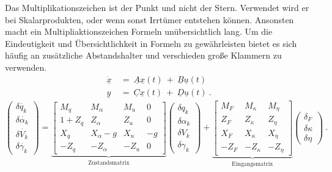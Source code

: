Das Multiplikationszeichen ist der Punkt und nicht der Stern. Verwendet wird er bei Skalarprodukten, oder wenn sonst Irrtümer entstehen können. Ansonsten macht ein Multipliaktionszeichen Formeln unübersichtlich lang. Um die Eindeutigkeit und Übersichtlichkeit in Formeln zu gewährleisten bietet es sich häufig an zusätzliche Abstandshalter und verschieden große Klammern zu verwenden.
\begin{equation}
\begin{split}
\dot{\underline{x}}&~=~\underline{A}\underline{x}(t)~+~%
							  \underline{B}\underline{u}(t)\\
\underline{y}&~=~\underline{C}\underline{x}(t)~+~\underline{D}\underline{u}(t)\:.
\end{split}
\label{eq:Gleichung1}
\end{equation} 
\begin{equation}
\begin{pmatrix}
	\delta\dot{q_k}		\\
	\delta\dot{\alpha_k}	\\
	\delta\dot{V_k}		\\
	\delta\dot{\gamma_k} \end{pmatrix}%
=\underbrace{\begin{bmatrix}
	M_q			& M_{\alpha} 	& M_u 	& 0	\\
	1+Z_q 		& Z_{\alpha} 	& Z_u	& 0	\\
	X_q			& X_{\alpha}-g	& X_u 	& -g\\
	-Z_q 		& -Z_{\alpha} 	& -Z_u	& 0	\end{bmatrix}}_{\text{Zustandsmatrix}}%
\begin{pmatrix}
	\delta{q_k}			\\
	\delta{\alpha_k}	\\
	\delta{V_k}			\\
	\delta{\gamma_k} 	\end{pmatrix}%
+\underbrace{\begin{bmatrix}
	M_{F} 		& M_{\kappa}	& M_{\eta}\\
	Z_{F} 		& Z_{\kappa}	& Z_{\eta}\\
	X_{F} 		& X_{\kappa}	& X_{\eta}\\
	-Z_{F} 		& -Z_{\kappa}	& -Z_{\eta}\end{bmatrix}}_{\text{Eingangsmatrix}}%
\begin{pmatrix}
	\delta_F		\\
	\delta\kappa	\\
	\delta\eta 		\end{pmatrix}\:.
\label{eq:gleichung2}
\end{equation}
